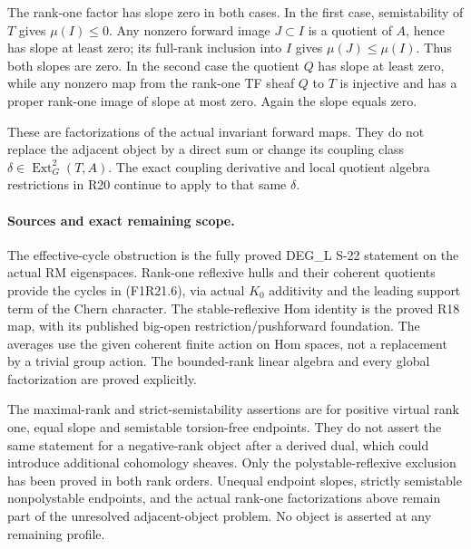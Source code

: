 The rank-one factor has slope zero in both cases.
In the first case, semistability of $T$ gives
$\mu(I)\le0$. Any nonzero forward image $J\subset I$
is a quotient of $A$, hence has slope at least zero;
its full-rank inclusion into $I$ gives
$\mu(J)\le\mu(I)$. Thus both slopes are zero.
In the second case the quotient $Q$ has slope at
least zero, while any nonzero map from the rank-one
TF sheaf $Q$ to $T$ is injective and has a proper
rank-one image of slope at most zero. Again the
slope equals zero.

These are factorizations of the actual invariant
forward maps. They do not replace the adjacent
object by a direct sum or change its coupling class
$\delta\in\operatorname{Ext}^2_G(T,A)$. The exact
coupling derivative and local quotient algebra
restrictions in R20 continue to apply to that same
$\delta$.

\paragraph{Sources and exact remaining scope.}
The effective-cycle obstruction is the fully proved
DEG\_L S-22 statement on the actual RM eigenspaces. Rank-one
reflexive hulls and their coherent quotients provide
the cycles in (F1R21.6), via actual $K_0$ additivity
and the leading support term of the Chern character.
The stable-reflexive Hom identity is the proved R18
map, with its published big-open restriction/pushforward
foundation. The averages use the given coherent
finite action on Hom spaces, not a replacement by a
trivial group action. The bounded-rank linear algebra
and every global factorization are proved explicitly.

The maximal-rank and strict-semistability assertions
are for positive virtual rank one, equal slope and
semistable torsion-free endpoints. They do not assert
the same statement for a negative-rank object after
a derived dual, which could introduce additional
cohomology sheaves. Only the polystable-reflexive
exclusion has been proved in both rank orders.
Unequal endpoint slopes, strictly semistable
nonpolystable endpoints, and the actual rank-one
factorizations above remain part of the unresolved
adjacent-object problem. No object is asserted at
any remaining profile.
